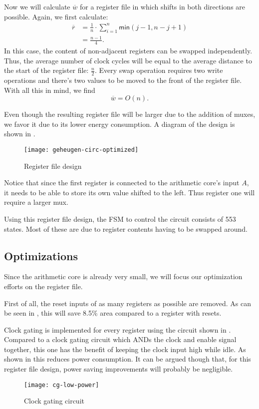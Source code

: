 Now we will calculate $\overline{w}$ for a register file in which shifts in both directions are possible. Again, we first calculate:
\begin{displaymath}\begin{aligned}
	\overline{r}	&= \frac{1}{n} \cdot \sum_{i = 1}^{n} \textsf{min}(j - 1, n - j + 1)\\
						&= \frac{n - 1}{4}.
\end{aligned}\end{displaymath}
In this case, the content of non-adjacent registers can be swapped independently. Thus, the average number of clock cycles will be equal to the average distance to the start of the register file: $\frac{n}{2}$. Every swap operation requires two write operations and there's two values to be moved to the front of the register file. With all this in mind, we find
\begin{displaymath}\overline{w} = O(n).\end{displaymath}

Even though the resulting register file will be larger due to the addition of muxes, we favor it due to its lower energy consumption. A diagram of the design is shown in .

\begin{figure}[h]
	\centering
		\texttt{[image: geheugen-circ-optimized]}
		\caption{Register file design\label{figure-regs}}
\end{figure}

Notice that since the first register is connected to the arithmetic core's input $A$, it needs to be able to store its own value shifted to the left. Thus register one will require a larger mux.

Using this register file design, the FSM to control the circuit consists of 553 states. Most of these are due to register contents having to be swapped around.

\subsection{Optimizations}

Since the arithmetic core is already very small, we will focus our optimization efforts on the register file.

First of all, the reset inputs of as many registers as possible are removed. As can be seen in , this will save 8.5\% area compared to a register with resets.

Clock gating is implemented for every register using the circuit shown in . Compared to a clock gating circuit which ANDs the clock and enable signal together, this one has the benefit of keeping the clock input high while idle. As shown in \cite{mueller} this reduces power consumption. It can be argued though that, for this register file design, power saving improvements will probably be negligible.

\begin{figure}[h]
	\centering
		\texttt{[image: cg-low-power]}
		\caption{Clock gating circuit\label{figure-cg}}
\end{figure}
